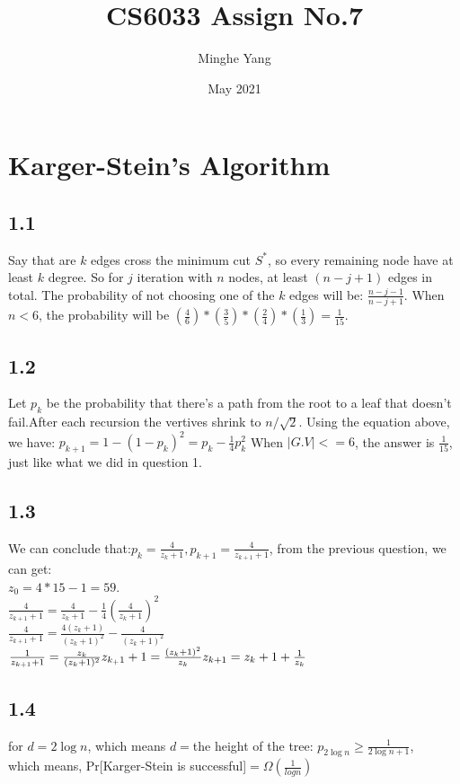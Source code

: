 \documentclass{article}
\title{CS6033 Assign No.7}
\author{Minghe Yang}
\date{May 2021}
\begin{document}
\renewcommand{\algorithmicrequire}{\textbf{Input:}} 
\renewcommand{\algorithmicensure}{\textbf{Output:}}
\maketitle

\section{Karger-Stein's Algorithm}
\subsection*{1.1}
Say that are $k$ edges cross the minimum cut $S^*$, so every remaining node have at least $k$ degree. So for $j$ iteration with $n$ nodes, at least $(n-j+1)$ edges in total. The probability of not choosing one of the $k$ edges will be:
$\frac{n-j-1}{n-j+1}$.
When $n < 6$, the probability will be 
$(\frac{4}{6})*(\frac{3}{5})*(\frac{2}{4})*(\frac{1}{3}) = \frac{1}{15}$.
\subsection*{1.2}
Let $p_k$ be the probability that there's a path from the root to a leaf that doesn't fail.After each recursion the vertives shrink to $n/\sqrt{2}$.
Using the equation above, we have:
$p_{k+1} = 1-(1-p_k)^2 = p_k - \frac{1}{4}p_k^2$ 
When $|G.V| <= 6$, the answer is $\frac{1}{15}$, just like what we did in question 1.
\subsection*{1.3}
We can conclude that:$p_k = \frac{4}{z_k +1}, p_{k+1} = \frac{4}{z_{k+1} +1}$, from the previous question, we can get:
\\$z_0 = 4*15-1 = 59$.
\\$\frac{4}{z_{k+1} +1} = \frac{4}{z_k +1}-\frac{1}{4}(\frac{4}{z_k +1})^2$
\\$\frac{4}{z_{k+1} +1} = \frac{4(z_k +1)}{(z_k +1)^2}-\frac{4}{(z_k +1)^2}$
\\$\frac{1}{z_{k+1} +1} = \frac{z_k}{(z_k+1)^2}
\\z_{k_+1}+1=\frac{(z_k+1)^2}{z_k}
\\z_{k+1} = z_k +1 + \frac{1}{z_k}
$
\subsection*{1.4}
for $d = 2\log{n}$, which means $d= $the height of the tree:
$p_{2\log{n}}\geq \frac{1}{2\log{n}+1}$,
\\which means, Pr[Karger-Stein is successful]$ = \Omega (\frac{1}{log{n}})$
\end{document}
